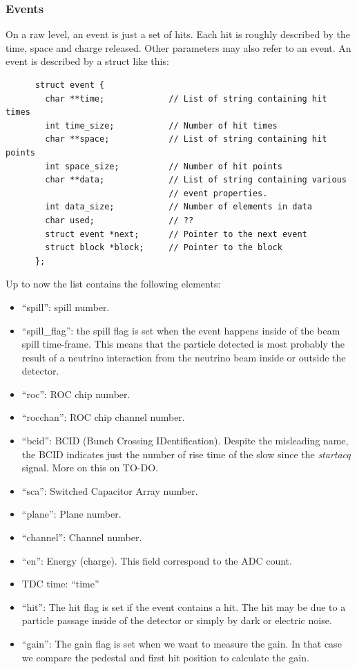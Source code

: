 \subsubsection{Events}
On a raw level, an event is just a set of hits. Each hit is roughly
described by the time, space and charge released. Other parameters may
also refer to an event. An event is described by a struct like this:
\begin{lstlisting}
      struct event {
        char **time;             // List of string containing hit times
        int time_size;           // Number of hit times
        char **space;            // List of string containing hit points
        int space_size;          // Number of hit points
        char **data;             // List of string containing various
                                 // event properties.
        int data_size;           // Number of elements in data
        char used;               // ??
        struct event *next;      // Pointer to the next event
        struct block *block;     // Pointer to the block
      };
\end{lstlisting}
Up to now the  list contains the following elements:
\begin{itemize}
\item ``spill'': spill number.
\item ``spill\_flag'': the spill flag is set when the event happens
  inside of the beam spill time-frame. This means that the particle
  detected is most probably the result of a neutrino interaction from
  the neutrino beam inside or outside the detector.
\item ``roc'': ROC chip number.
\item ``rocchan'': ROC chip channel number.
\item ``bcid'': BCID (Bunch Crossing IDentification). Despite the
  misleading name, the BCID indicates just the number of rise time of
  the slow since the \textit{startacq} signal. More on this on
  TO-DO.\@
\item ``sca'': Switched Capacitor Array number.
\item ``plane'': Plane number.
\item ``channel'': Channel number.
\item ``en'': Energy (charge). This field correspond to the ADC count.
\item TDC time: ``time''
\item ``hit'': The hit flag is set if the event contains a hit. The
  hit may be due to a particle passage inside of the detector or
  simply by dark or electric noise.
\item ``gain'': The gain flag is set when we want to measure the
  gain. In that case we compare the pedestal and first hit position to
  calculate the gain.
\end{itemize}


